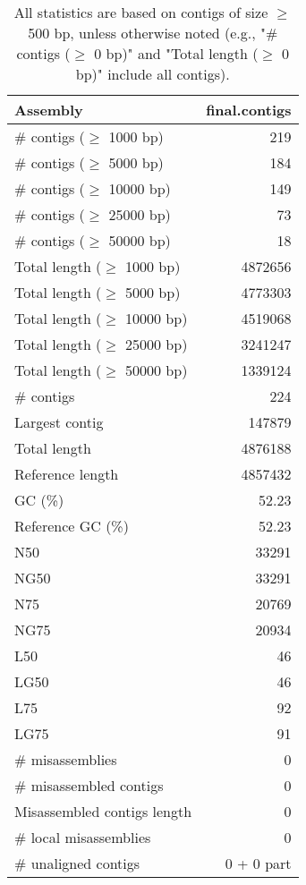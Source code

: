 \documentclass[12pt,a4paper]{article}
\begin{document}
\begin{table}[ht]
\begin{center}
\caption{All statistics are based on contigs of size $\geq$ 500 bp, unless otherwise noted (e.g., "\# contigs ($\geq$ 0 bp)" and "Total length ($\geq$ 0 bp)" include all contigs).}
\begin{tabular}{|l*{1}{|r}|}
\hline
Assembly & final.contigs \\ \hline
\# contigs ($\geq$ 1000 bp) & 219 \\ \hline
\# contigs ($\geq$ 5000 bp) & 184 \\ \hline
\# contigs ($\geq$ 10000 bp) & 149 \\ \hline
\# contigs ($\geq$ 25000 bp) & 73 \\ \hline
\# contigs ($\geq$ 50000 bp) & 18 \\ \hline
Total length ($\geq$ 1000 bp) & 4872656 \\ \hline
Total length ($\geq$ 5000 bp) & 4773303 \\ \hline
Total length ($\geq$ 10000 bp) & 4519068 \\ \hline
Total length ($\geq$ 25000 bp) & 3241247 \\ \hline
Total length ($\geq$ 50000 bp) & 1339124 \\ \hline
\# contigs & 224 \\ \hline
Largest contig & 147879 \\ \hline
Total length & 4876188 \\ \hline
Reference length & 4857432 \\ \hline
GC (\%) & 52.23 \\ \hline
Reference GC (\%) & 52.23 \\ \hline
N50 & 33291 \\ \hline
NG50 & 33291 \\ \hline
N75 & 20769 \\ \hline
NG75 & 20934 \\ \hline
L50 & 46 \\ \hline
LG50 & 46 \\ \hline
L75 & 92 \\ \hline
LG75 & 91 \\ \hline
\# misassemblies & 0 \\ \hline
\# misassembled contigs & 0 \\ \hline
Misassembled contigs length & 0 \\ \hline
\# local misassemblies & 0 \\ \hline
\# unaligned contigs & 0 + 0 part \\ \hline

\end{tabular}
\end{center}
\end{table}
\end{document}
